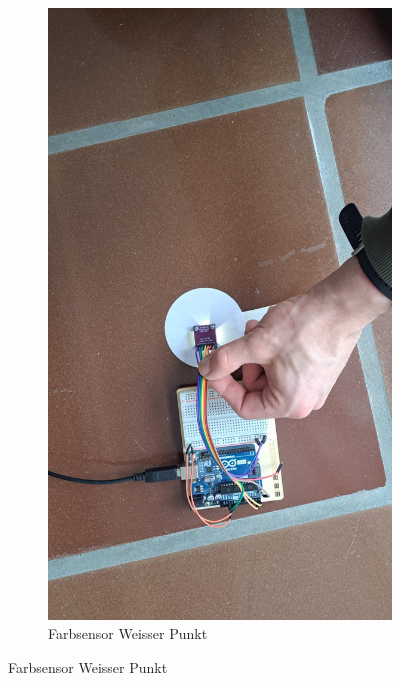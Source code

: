 \begin{figure}[H]
\begin{subfigure}{0.3\textwidth}
        \centering
        \includegraphics[width=\linewidth]{img/sensortest/Farbsensor_WeisserPunkt.jpg}
        \caption{Farbsensor Weisser Punkt}
        \label{fig:FarbsensorWeisserPunkt}
    \end{subfigure}
    
    \vspace{0.5cm}


\end{figure}
